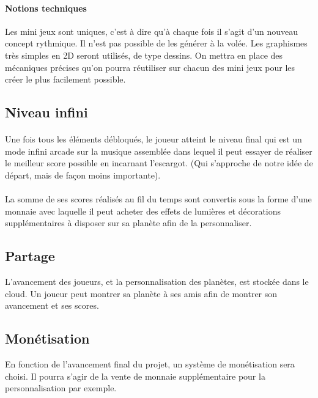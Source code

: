 \documentclass[a4paper,11pt]{article}
\begin{document}
\paragraph{Notions techniques}
Les mini jeux sont uniques, c’est à dire qu’à chaque fois il s’agit d’un nouveau concept rythmique. Il n’est pas possible de les générer à la volée. Les graphismes très simples en 2D seront utilisés, de type dessins. On mettra en place des mécaniques précises qu’on pourra réutiliser sur chacun des mini jeux pour les créer le plus facilement possible.

\subsection{Niveau infini}
\paragraph{} Une fois tous les éléments débloqués, le joueur atteint le niveau final qui est un mode infini arcade sur la musique assemblée dans lequel il peut essayer de réaliser le meilleur score possible en incarnant l’escargot. (Qui s’approche de notre idée de départ, mais de façon moins importante).

\paragraph{} La somme de ses scores réalisés au fil du temps sont convertis sous la forme d’une monnaie avec laquelle il peut acheter des effets de lumières et décorations supplémentaires à disposer sur sa planète afin de la personnaliser.

\subsection{Partage}
L’avancement des joueurs, et la personnalisation des planètes, est stockée dans le cloud. Un joueur peut montrer sa planète à ses amis afin de montrer son avancement et ses scores.

\subsection{Monétisation}
En fonction de l’avancement final du projet, un système de monétisation sera choisi. Il pourra s’agir de la vente de monnaie supplémentaire pour la personnalisation par exemple.
\end{document}
